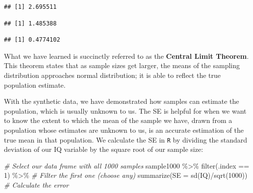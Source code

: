 \documentclass[
]{book}
\newenvironment{Shaded}{\begin{snugshade}}{\end{snugshade}}
\newcommand{\AttributeTok}[1]{\textcolor[rgb]{0.77,0.63,0.00}{#1}}
\newcommand{\CommentTok}[1]{\textcolor[rgb]{0.56,0.35,0.01}{\textit{#1}}}
\newcommand{\DecValTok}[1]{\textcolor[rgb]{0.00,0.00,0.81}{#1}}
\newcommand{\FunctionTok}[1]{\textcolor[rgb]{0.00,0.00,0.00}{#1}}
\newcommand{\NormalTok}[1]{#1}
\newcommand{\SpecialCharTok}[1]{\textcolor[rgb]{0.00,0.00,0.00}{#1}}
\begin{document}
\begin{Shaded}
\end{Shaded}

\begin{verbatim}
## [1] 2.695511
\end{verbatim}

\begin{Shaded}
\end{Shaded}

\begin{verbatim}
## [1] 1.485388
\end{verbatim}

\begin{Shaded}
\end{Shaded}

\begin{verbatim}
## [1] 0.4774102
\end{verbatim}

What we have learned is succinctly referred to as the \textbf{Central Limit Theorem}. This theorem states that as sample sizes get larger, the means of the sampling distribution approaches normal distribution; it is able to reflect the true population estimate.

With the synthetic data, we have demonstrated how samples can estimate the population, which is usually unknown to us. The SE is helpful for when we want to know the extent to which the mean of the sample we have, drawn from a population whose estimates are unknown to us, is an accurate estimation of the true mean in that population. We calculate the SE in \texttt{R} by dividing the standard deviation of our IQ variable by the square root of our sample size:

\begin{Shaded}
\begin{Highlighting}[]
\CommentTok{\# Select our data frame with all 1000 samples}
\NormalTok{sample1000 }\SpecialCharTok{\%\textgreater{}\%} 
  \FunctionTok{filter}\NormalTok{(.index }\SpecialCharTok{==} \DecValTok{1}\NormalTok{) }\SpecialCharTok{\%\textgreater{}\%} \CommentTok{\# Filter the first one (choose any)}
  \FunctionTok{summarize}\NormalTok{(}\AttributeTok{SE =} \FunctionTok{sd}\NormalTok{(IQ)}\SpecialCharTok{/}\FunctionTok{sqrt}\NormalTok{(}\DecValTok{1000}\NormalTok{)) }\CommentTok{\# Calculate the error}
\end{Highlighting}
\end{Shaded}
\end{document}
